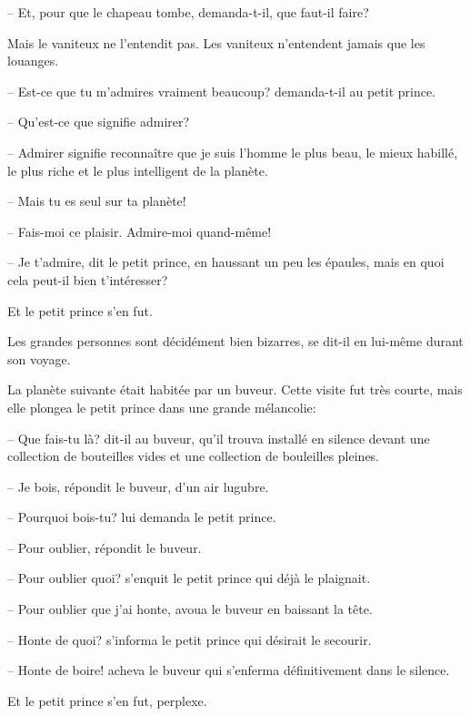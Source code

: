 \documentclass[a4paper]{report}
\begin{document}
-- Et, pour que le chapeau tombe, demanda-t-il, que faut-il faire?

Mais le vaniteux ne l'entendit pas. Les vaniteux n'entendent jamais que les louanges.

-- Est-ce que tu m'admires vraiment beaucoup? demanda-t-il au petit prince.

-- Qu'est-ce que signifie admirer?

-- Admirer signifie reconnaître que je suis l'homme le plus beau, le mieux habillé, le plus riche et le plus intelligent de la planète.

-- Mais tu es seul sur ta planète!

-- Fais-moi ce plaisir. Admire-moi quand-même!

-- Je t'admire, dit le petit prince, en haussant un peu les épaules, mais en quoi cela peut-il bien t'intéresser?

Et le petit prince s'en fut.

Les grandes personnes sont décidément bien bizarres, se dit-il en lui-même durant son voyage.

\parachapter[XII]{} %
La planète suivante était habitée par un buveur. Cette visite fut très courte, mais elle plongea le petit prince dans une grande mélancolie:

-- Que fais-tu là? dit-il au buveur, qu'il trouva installé en silence devant une collection de bouteilles vides et une collection de bouleilles pleines.


-- Je bois, répondit le buveur, d'un air lugubre.

-- Pourquoi bois-tu? lui demanda le petit prince.

-- Pour oublier, répondit le buveur.

-- Pour oublier quoi? s'enquit le petit prince qui déjà le plaignait.

-- Pour oublier que j'ai honte, avoua le buveur en baissant la tête.

-- Honte de quoi? s'informa le petit prince qui désirait le secourir.

-- Honte de boire! acheva le buveur qui s'enferma définitivement dans le silence.

Et le petit prince s'en fut, perplexe.
\end{document}

